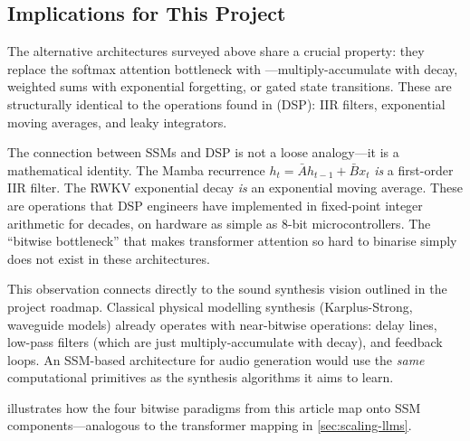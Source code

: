 \subsection{Implications for This Project}
\label{sec:alt-arch-implications}

The alternative architectures surveyed above share a crucial
property: they replace the softmax attention bottleneck with
---multiply-accumulate with decay,
weighted sums with exponential forgetting, or gated state
transitions. These are structurally identical to the operations
found in  (DSP): IIR filters,
exponential moving averages, and leaky integrators.

\begin{keyinsight}
The connection between SSMs and DSP is not a loose analogy---it is a
mathematical identity. The Mamba recurrence
$h_t = \bar{A} h_{t-1} + \bar{B} x_t$ \emph{is} a first-order IIR
filter. The RWKV exponential decay \emph{is} an exponential moving
average. These are operations that DSP engineers have implemented in
fixed-point integer arithmetic for decades, on hardware as simple as
8-bit microcontrollers. The ``bitwise bottleneck'' that makes
transformer attention so hard to binarise simply does not exist in
these architectures.
\end{keyinsight}

This observation connects directly to the sound synthesis vision
outlined in the project roadmap. Classical physical modelling synthesis
(Karplus-Strong, waveguide models) already operates with
near-bitwise operations: delay lines, low-pass filters (which are
just multiply-accumulate with decay), and feedback loops. An
SSM-based architecture for audio generation would use the
\emph{same} computational primitives as the synthesis algorithms it
aims to learn.

 illustrates how the four bitwise
paradigms from this article map onto SSM components---analogous to
the transformer mapping in \cref{sec:scaling-llms}.


